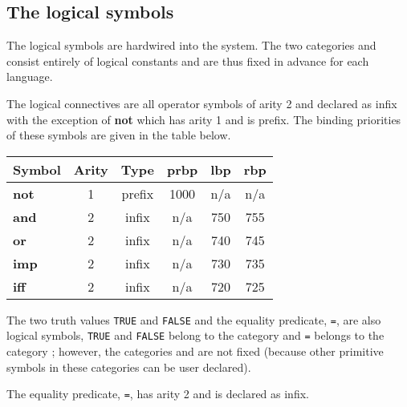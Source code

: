 \subsection{The logical symbols}
\label{sec-log-symb}

The logical symbols are hardwired into the system.
The two categories {\quant} and {\sentconn}
consist entirely of logical constants and are thus fixed in advance for each
language.

\gap
\begin{center}
\end{center}

The logical connectives are all operator symbols
of arity 2 and declared as infix with the exception of {\bf not}
which has arity 1 and is prefix. The binding priorities of these symbols are
given in the table below.

\begin{center}
\begin{tabular}{|l|c|c|ccc|} \hline
\multicolumn{1}{|c}{Symbol} &
\multicolumn{1}{c}{Arity} &
\multicolumn{1}{c}{Type} &
\multicolumn{1}{c}{prbp} & lbp & rbp \\ \hline
{\bf not} & 1 & prefix & 1000 & n/a & n/a \\ \hline
{\bf and} & 2 & infix & n/a  & 750 & 755 \\ \hline
{\bf or} & 2 & infix & n/a  & 740 & 745 \\ \hline
{\bf imp} & 2 & infix & n/a  & 730 & 735 \\ \hline
{\bf iff} & 2 & infix & n/a  & 720 & 725 \\ \hline
\end{tabular}
\end{center}

The two truth values {\tt TRUE} and {\tt FALSE} and the equality
predicate, {\tt =}, are also logical symbols, {\tt TRUE} and
{\tt FALSE} belong to the category {\sentconst} and {\tt =} belongs to the
category {\predconst}; however, the categories {\sentconst} and
{\predconst} are not fixed
(because other primitive symbols in these categories
can be user declared).

The equality predicate, {\tt =}, has arity 2 and is declared as infix.



